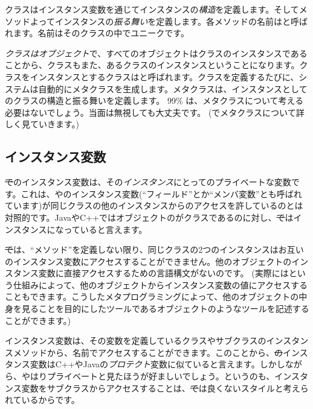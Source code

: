 \documentclass[a4paper,10pt,twoside]{book}
\begin{document}
クラスはインスタンス変数を通じてインスタンスの\emph{構造}を定義します。そしてメソッドよってインスタンスの\emph{振る舞い}を定義します。各メソッドの名前はと呼ばれます。名前はそのクラスの中でユニークです。

\emph{クラスはオブジェクト}で、{すべてのオブジェクトはクラスのインスタンスである}ことから、クラスもまた、あるクラスのインスタンスということになります。クラスをインスタンスとするクラスはと呼ばれます。クラスを定義するたびに、システムは自動的にメタクラスを生成します。メタクラスは、インスタンスとしてのクラスの構造と振る舞いを定義します。
99\% は、メタクラスについて考える必要はないでしょう。当面は無視しても大丈夫です。
(でメタクラスについて詳しく見ていきます。)
\subsection{インスタンス変数}

\st でのインスタンス変数は、その\emph{インスタンス}にとってのプライベートな変数です。これは、やのインスタンス変数(``フィールド''とか``メンバ変数''とも呼ばれています)が同じクラスの他のインスタンスからのアクセスを許しているのとは対照的です。JavaやC++ではオブジェクトのがクラスであるのに対し、\st ではインスタンスになっていると言えます。


\st では、``メソッド''を定義しない限り、同じクラスの2つのインスタンスはお互いのインスタンス変数にアクセスすることができません。他のオブジェクトのインスタンス変数に直接アクセスするための言語構文がないのです。
(実際にはという仕組みによって、他のオブジェクトからインスタンス変数の値にアクセスすることもできます。こうしたメタプログラミングによって、他のオブジェクトの中身を見ることを目的にしたツールであるオブジェクトのようなツールを記述することができます。)

インスタンス変数は、その変数を定義しているクラスやサブクラスのインスタンスメソッドから、名前でアクセスすることができます。このことから、\st のインスタンス変数はC++やJavaの\emph{プロテクト}変数に似ていると言えます。しかしながら、やはりプライベートと見たほうが好ましいでしょう。というのも、インスタンス変数をサブクラスからアクセスすることは、\st では良くないスタイルと考えられているからです。
\end{document}
